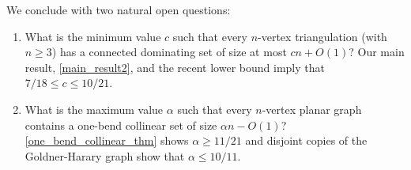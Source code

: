 \documentclass[a4paper,UKenglish, cleveref, autoref, thm-restate]{lipics-v2021}
\begin{document}
We conclude with two natural open questions:

\begin{enumerate}
  \item What is the minimum value $c$ such that every $n$-vertex triangulation (with $n\geq 3$) has a connected dominating set of size at most $c n+O(1)$? Our main result, \cref{main_result2}, and the recent lower bound \cite{enami2025contributionsconjecturesplanargraphs} imply that $7/18 \leq c\leq 10/21$.

  \item What is the maximum value $\alpha$ such that every $n$-vertex planar graph contains a one-bend collinear set of size $\alpha n-O(1)$?  \cref{one_bend_collinear_thm} shows $\alpha \ge 11/21$ and disjoint copies of the Goldner-Harary graph show that $\alpha \le 10/11$.

\end{enumerate}


\end{document}
